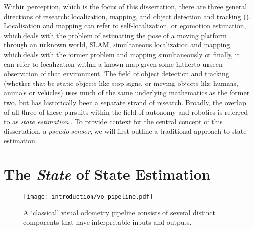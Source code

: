  Within perception, which is the focus of this dissertation, there are three general directions of research: localization, mapping, and object detection and tracking (). Localization and mapping can refer to self-localization, or egomotion estimation, which deals with the problem of estimating the pose of a moving platform through an unknown world, SLAM, simultaneous localization and mapping, which deals with the former problem and mapping simultaneously or finally, it can refer to localization within a known map given some hitherto unseen observation of that environment. The field of object detection and tracking (whether that be static objects like stop signs, or moving objects like humans, animals or vehicles) uses much of the same underlying mathematics as the former two, but has historically been a separate strand of research. Broadly, the overlap of all three of these pursuits within the field of autonomy and robotics is referred to as \textit{state estimation} \citep{Barfoot2017-ri}. To provide context for the central concept of this dissertation, a \textit{pseudo-sensor}, we will first outline a traditional approach to state estimation.


\section{The \textit{State} of State Estimation}

\begin{figure}
\begin{center}
		\texttt{[image: introduction/vo\_pipeline.pdf]}
		\caption{A `classical' visual odometry pipeline consists of several distinct components that have interpretable inputs and outputs.}
  	\label{fig:intro_vo_pipeline}
\end{center}
\end{figure}


